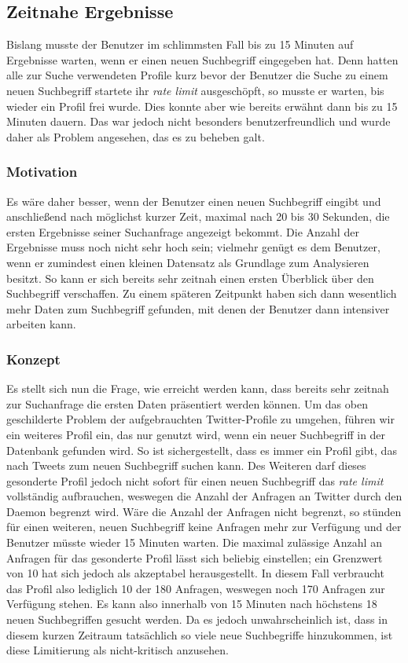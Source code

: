 \subsection{Zeitnahe Ergebnisse}
\label{ssection:ZeitnaheErgebnisse}
Bislang musste der Benutzer im schlimmsten Fall bis zu 15 Minuten auf Ergebnisse warten, wenn er einen neuen Suchbegriff eingegeben hat.
Denn hatten alle zur Suche verwendeten Profile kurz bevor der Benutzer die Suche zu einem neuen Suchbegriff startete ihr \textit{rate limit} ausgeschöpft, so musste er warten, bis wieder ein Profil frei wurde.
Dies konnte aber wie bereits erwähnt dann bis zu 15 Minuten dauern.
Das war jedoch nicht besonders benutzerfreundlich und wurde daher als Problem angesehen, das es zu beheben galt.

\subsubsection{Motivation}

Es wäre daher besser, wenn der Benutzer einen neuen Suchbegriff eingibt und anschließend nach möglichst kurzer Zeit, maximal nach 20 bis 30 Sekunden, die ersten Ergebnisse seiner Suchanfrage angezeigt bekommt.
Die Anzahl der Ergebnisse muss noch nicht sehr hoch sein; vielmehr genügt es dem Benutzer, wenn er zumindest einen kleinen Datensatz als Grundlage zum Analysieren besitzt.
So kann er sich bereits sehr zeitnah einen ersten Überblick über den Suchbegriff verschaffen.
Zu einem späteren Zeitpunkt haben sich dann wesentlich mehr Daten zum Suchbegriff gefunden, mit denen der Benutzer dann intensiver arbeiten kann.

\subsubsection{Konzept}

Es stellt sich nun die Frage, wie erreicht werden kann, dass bereits sehr zeitnah zur Suchanfrage die ersten Daten präsentiert werden können.
Um das oben geschilderte Problem der aufgebrauchten Twitter-Profile zu umgehen, führen wir ein weiteres Profil ein, das nur genutzt wird, wenn ein neuer Suchbegriff in der Datenbank gefunden wird.
So ist sichergestellt, dass es immer ein Profil gibt, das nach Tweets zum neuen Suchbegriff suchen kann.
Des Weiteren darf dieses gesonderte Profil jedoch nicht sofort für einen neuen Suchbegriff das \textit{rate limit} vollständig aufbrauchen, weswegen die Anzahl der Anfragen an Twitter durch den Daemon begrenzt wird.
Wäre die Anzahl der Anfragen nicht begrenzt, so stünden für einen weiteren, neuen Suchbegriff keine Anfragen mehr zur Verfügung und der Benutzer müsste wieder 15 Minuten warten.
Die maximal zulässige Anzahl an Anfragen für das gesonderte Profil lässt sich beliebig einstellen; ein Grenzwert von 10 hat sich jedoch als akzeptabel herausgestellt.
In diesem Fall verbraucht das Profil also lediglich 10 der 180 Anfragen, weswegen noch 170 Anfragen zur Verfügung stehen.
Es kann also innerhalb von 15 Minuten nach höchstens 18 neuen Suchbegriffen gesucht werden.
Da es jedoch unwahrscheinlich ist, dass in diesem kurzen Zeitraum tatsächlich so viele neue Suchbegriffe hinzukommen, ist diese Limitierung als nicht-kritisch anzusehen.


